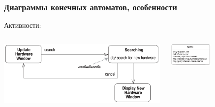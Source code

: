 \documentclass[xetex,mathserif,serif]{beamer}
\begin{document}
    \begin{frame}
        \frametitle{Диаграммы конечных автоматов, особенности}
        Активности:
        \begin{columns}
            \begin{column}{0.5\textwidth}
                \begin{center}
                    \includegraphics[width=\textwidth]{stateTransitionInternalEventExample.png}
                \end{center}
            \end{column}
            \begin{column}{0.5\textwidth}
                \begin{center}
                    \includegraphics[width=0.5\textwidth]{stateTransitionInternalEvents.png}
                \end{center}
            \end{column}
        \end{columns}


\end{frame}
\end{document}
